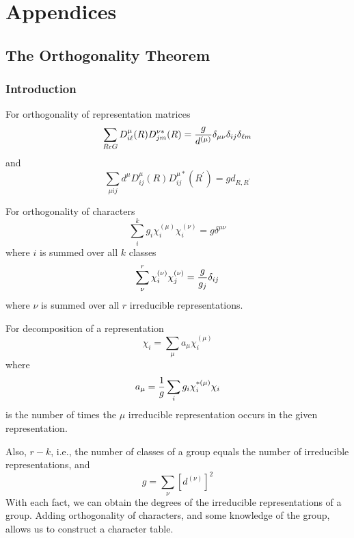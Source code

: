 \section{Appendices}

\subsection{The Orthogonality Theorem}

\subsubsection{Introduction}

For orthogonality of representation matrices
\begin{equation}
\sum_{R \epsilon G} D^{\mu}_{i\ell} (R) D^{\nu*}_{jm} (R) = {g \over 
d^{(\mu)}} \delta_{\mu \nu} \delta_{ij} \delta_{\ell m}
\end{equation}
and
\begin{equation}
\sum_{\mu ij} d^{\mu} D^{\mu}_{ij}(R) D^{\mu*}_{ij}(R^{\prime}) = 
gd_{R,R^{\prime}}
\end{equation}

For orthogonality of characters
\begin{equation}
\sum^k_i g_i \chi_i^{(\mu)} \chi_i^{(\nu)} = g \delta^{\mu \nu}
\end{equation}
where $i$ is summed over all $k$ classes
\begin{equation}
\sum^r_{\nu} \chi_i^{(\nu)} \chi_j^{(\nu)} = {g \over g_j} \delta_{ij}
\end{equation}
where $\nu$ is summed over all $r$ irreducible representations.

For decomposition of a representation
\begin{equation}
\chi_i = \sum_{\mu} a_{\mu} \chi_i^{(\mu)}
\end{equation}
where
\begin{equation}
a_{\mu} = {1 \over g} \sum_i g_i \chi_i^{*(\mu)} \chi_i
\end{equation}
is the number of times the $\mu$ irreducible representation occurs in 
the given representation.

Also, $r - k$, i.e., the number of classes of a group equals the 
number of irreducible representations, and
\begin{equation}
g = \sum_{\nu} \left[ d^{(\nu)} \right]^2
\end{equation}
With each fact, we can obtain the degrees of the irreducible 
representations of a group.  Adding orthogonality of characters, and 
some knowledge of the group, allows us to construct a character table.

